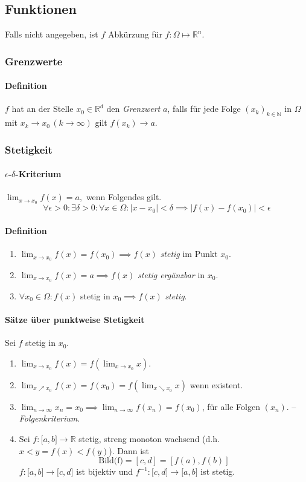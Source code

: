 \documentclass[a4paper, 9pt, DIV=24]{scrartcl}
\newcommand{\N}{\mathbb{N}}
\newcommand{\R}{\mathbb{R}}
\begin{document}
\subsection{Funktionen}
Falls nicht angegeben, ist $f$ Abkürzung für $f: \Omega \mapsto \R^n$.
\subsubsection{Grenzwerte}
\paragraph*{Definition} $f$ hat an der Stelle $x_{0} \in \R^{d}$ den \emph{Grenzwert} $a$, falls für jede Folge $(x_k)_{k\in \N}$ in $\Omega$ mit $x_{k} \to x_{0}\, (k \to \infty)$ gilt $f(x_{k}) \to a$.
\subsubsection{Stetigkeit}
\paragraph{$\epsilon$-$\delta$-Kriterium} $\lim_{x\rightarrow x_0} f(x) = a, $ wenn Folgendes gilt.
\[\forall\epsilon>0:\exists\delta>0: \forall x \in \Omega: |x-x_0| < \delta \implies |f(x) - f(x_0)| < \epsilon \]
\paragraph{Definition}
\begin{enumerate}[label={(}\arabic*{)}]
 \item $\lim_{x\rightarrow x_0} f(x) = f(x_0) \implies f(x)$ \emph{stetig} im Punkt $x_0$.
 \item $\lim_{x\rightarrow x_0} f(x) = a \implies f(x)$ \emph{stetig ergänzbar} in $x_0$.
 \item $\forall x_0\in\Omega: f(x) $ stetig in $x_0 \implies f(x)$ \emph{stetig}.
\end{enumerate}

\paragraph{Sätze über punktweise Stetigkeit}
Sei $f$ stetig in $x_0$.
\begin{enumerate}[label={(}\arabic*{)}]
 \item $\lim_{x\rightarrow x_0} f(x) = f(\lim_{x\rightarrow x_0} x)$.
 \item $\lim_{x\nearrow x_0} f(x) = f(x_0) = f(\lim_{x\searrow x_0} x)$ wenn existent.
 \item $\lim_{n\rightarrow \infty} x_n = x_0 \implies \lim_{n\rightarrow \infty} f(x_n) = f(x_0)$, für alle Folgen $(x_n)$. -- \emph{Folgenkriterium}.
 \item Sei $f:\lbrack a,b\rbrack\to\R$ stetig, streng monoton wachsend (d.h. $x<y=f(x)<f\left( y\right)$). Dann ist
$$\mbox{Bild(f)}=[c,d]=\left[ f\left( a\right), f\left( b\right)\right]$$
$f:\lbrack a,b\rbrack\to\lbrack c,d\rbrack$ ist bijektiv und $f^{-1}:\lbrack c,d\rbrack\to\lbrack a,b\rbrack$ ist stetig.
\end{enumerate}
\end{document}
